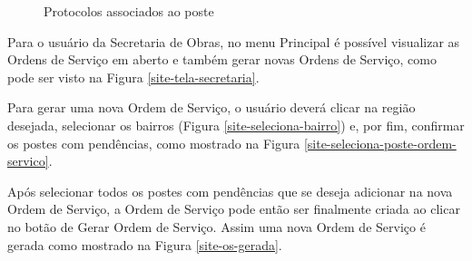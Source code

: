 \documentclass[
	article,			%
	11pt,				%
	oneside,			%
	a4paper,			%
	english,			%
	brazil,				%
	sumario=tradicional
	]{abntex2}
\begin{document}
\begin{figure}[!htbp]
 \centering
 \caption{\label{site-protocolos-poste}Protocolos associados ao poste}
\end{figure}

Para o usuário da Secretaria de Obras, no menu Principal é possível visualizar as Ordens de Serviço em aberto e também gerar novas Ordens de Serviço, como pode ser visto na Figura \ref{site-tela-secretaria}.

Para gerar uma nova Ordem de Serviço, o usuário deverá clicar na região desejada, selecionar os bairros (Figura \ref{site-seleciona-bairro}) e, por fim, confirmar os postes com pendências, como mostrado na Figura \ref{site-seleciona-poste-ordem-servico}.

Após selecionar todos os postes com pendências que se deseja adicionar na nova Ordem de Serviço, a Ordem de Serviço pode então ser finalmente criada ao clicar no botão de Gerar Ordem de Serviço.
Assim uma nova Ordem de Serviço é gerada como mostrado na Figura \ref{site-os-gerada}.
\end{document}
